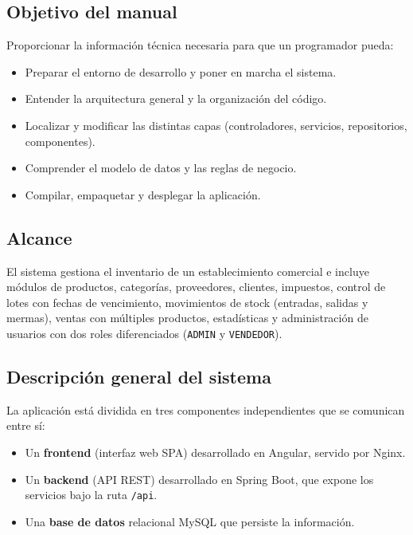 \documentclass[11pt,a4paper]{article}
\begin{document}
\subsection{Objetivo del manual}

Proporcionar la información técnica necesaria para que un programador pueda:

\begin{itemize}[noitemsep]
    \item Preparar el entorno de desarrollo y poner en marcha el sistema.
    \item Entender la arquitectura general y la organización del código.
    \item Localizar y modificar las distintas capas (controladores,
          servicios, repositorios, componentes).
    \item Comprender el modelo de datos y las reglas de negocio.
    \item Compilar, empaquetar y desplegar la aplicación.
\end{itemize}

\subsection{Alcance}

El sistema gestiona el inventario de un establecimiento comercial e incluye
módulos de productos, categorías, proveedores, clientes, impuestos, control
de lotes con fechas de vencimiento, movimientos de stock (entradas, salidas
y mermas), ventas con múltiples productos, estadísticas y administración de
usuarios con dos roles diferenciados (\texttt{ADMIN} y \texttt{VENDEDOR}).

\subsection{Descripción general del sistema}

La aplicación está dividida en tres componentes independientes que se
comunican entre sí:

\begin{itemize}[noitemsep]
    \item Un \textbf{frontend} (interfaz web SPA) desarrollado en Angular,
          servido por Nginx.
    \item Un \textbf{backend} (API REST) desarrollado en Spring Boot, que
          expone los servicios bajo la ruta \texttt{/api}.
    \item Una \textbf{base de datos} relacional MySQL que persiste la
          información.
\end{itemize}
\end{document}
